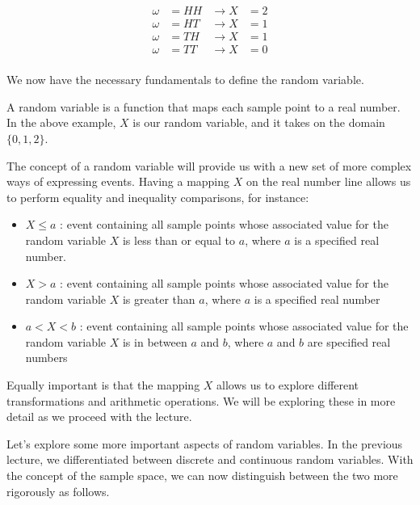 \documentclass{article}
\begin{document}
$$
\begin{aligned}
\omega &= HH &\to X &= 2 \\
\omega &= HT &\to X &= 1 \\
\omega &= TH &\to X &= 1 \\
\omega &= TT &\to X &= 0 \\
\end{aligned}
$$

We now have the necessary fundamentals to define the random variable.

A random variable is a function that maps each sample point to a real number. In the above example, $X$ is our random variable, and it takes on the domain $\{ 0, 1, 2 \}$.

The concept of a random variable will provide us with a new set of more complex ways of expressing events. Having a mapping $X$ on the real number line allows us to perform equality and inequality comparisons, for instance:

\begin{itemize}
    \item $X\leq a$ : event containing all sample points whose associated value for the random variable $X$ is less than or equal to $a$, where $a$ is a specified real number.
    \item $X > a$ : event containing all sample points whose associated value for the random variable $X$ is greater than $a$, where $a$ is a specified real number
    \item $a < X < b$ : event containing all sample points whose associated value for the random variable $X$ is in between $a$ and $b$, where $a$ and $b$ are specified real numbers
\end{itemize}

Equally important is that the mapping $X$ allows us to explore different transformations and arithmetic operations. We will be exploring these in more detail as we proceed with the lecture.

Let's explore some more important aspects of random variables. In the previous lecture, we differentiated between discrete and continuous random variables. With the concept of the sample space, we can now distinguish between the two more rigorously as follows.
\end{document}
